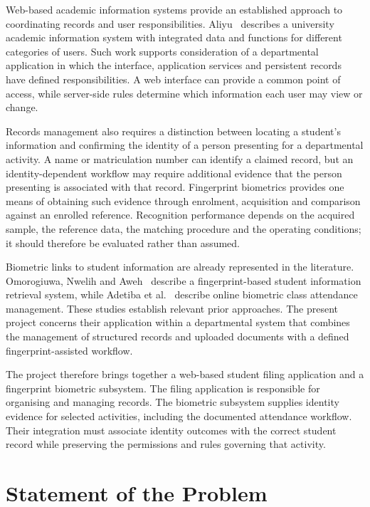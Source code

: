 Web-based academic information systems provide an established approach to coordinating records and user responsibilities. Aliyu~\cite[pp. 2-3, 20-26]{aliyu2015} describes a university academic information system with integrated data and functions for different categories of users. Such work supports consideration of a departmental application in which the interface, application services and persistent records have defined responsibilities. A web interface can provide a common point of access, while server-side rules determine which information each user may view or change.

Records management also requires a distinction between locating a student's information and confirming the identity of a person presenting for a departmental activity. A name or matriculation number can identify a claimed record, but an identity-dependent workflow may require additional evidence that the person presenting is associated with that record. Fingerprint biometrics provides one means of obtaining such evidence through enrolment, acquisition and comparison against an enrolled reference. Recognition performance depends on the acquired sample, the reference data, the matching procedure and the operating conditions; it should therefore be evaluated rather than assumed.

Biometric links to student information are already represented in the literature. Omorogiuwa, Nwelih and Aweh~\cite{omorogiuwa2023} describe a fingerprint-based student information retrieval system, while Adetiba et al.~\cite{adetiba2013} describe online biometric class attendance management. These studies establish relevant prior approaches. The present project concerns their application within a departmental system that combines the management of structured records and uploaded documents with a defined fingerprint-assisted workflow.

The project therefore brings together a web-based student filing application and a fingerprint biometric subsystem. The filing application is responsible for organising and managing records. The biometric subsystem supplies identity evidence for selected activities, including the documented attendance workflow. Their integration must associate identity outcomes with the correct student record while preserving the permissions and rules governing that activity.

\section{Statement of the Problem}\label{sec:1-2}

